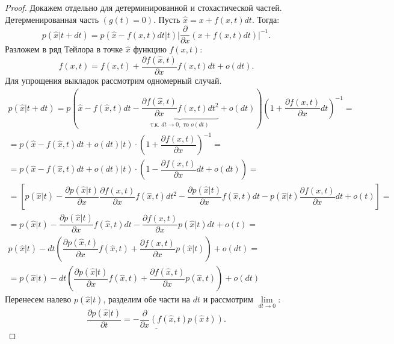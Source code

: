 \begin{proof}
    Докажем отдельно для детерминированной и стохастической частей. Детерменированная часть $(g(t) = 0)$. Пусть $\hat{x} = x + f(x,t)dt$. Тогда:
    \[
        p(\hat{x} | t + dt) = p(\hat{x} - f(x,t)dt | t) \bigg|\dfrac{\partial }{\partial x} (x + f(x, t)dt)\bigg|^{-1}.
    \]
    Разложем в ряд Тейлора в точке $\hat{x}$ функцию $f(x,t)$:
    \[
        f(x, t) = f(\hat{x}, t) + \dfrac{\partial f(\hat{x}, t)}{\partial x} f(x,t)dt + o(dt).
    \]
    Для упрощения выкладок рассмотрим одномерный случай. 
    \[
        \begin{array}{c}
            p(\hat{x} | t + dt) = p\left(\hat{x} - f(\hat{x}, t) dt - \underbrace{\dfrac{\partial f(\hat{x}, t)}{\partial x} f(x, t) dt^2}_{\text{т.к. } dt \to 0, \text{ то } o(dt)} + o(dt)\right)\left(1 + \dfrac{\partial f(x, t)}{\partial x} dt\right)^{-1} = \\[0.5cm]
            = p(\hat{x} - f(\hat{x}, t)dt + o(dt)| t) \cdot \left(1 + \dfrac{\partial f(x, t)}{\partial x}\right)^{-1} = \\[0.5cm]
            = p(\hat{x} - f(\hat{x}, t) dt + o(dt) | t) \cdot \left(1 - \dfrac{\partial f(x, t)}{\partial x} dt + o(dt)\right) = \\ [0.5cm]
            = \left[p(\hat{x} | t) - \dfrac{\partial p(\hat{x} | t)}{\partial x} \dfrac{\partial f(x,t)}{\partial x} f(\hat{x}, t)dt^2 - \dfrac{\partial p(\hat{x} | t)}{\partial x} f(\hat{x}, t)dt - p(\hat{x} | t) \dfrac{\partial f(x,t)}{\partial x} dt + o(t)\right] = \\[0.5cm]
            = p(\hat{x} | t) - \dfrac{\partial p(\hat{x} | t)}{\partial x} f(\hat{x}, t) dt - \dfrac{\partial f(x,t)}{\partial x} p(\hat{x} | t) dt + o(t) = \\
            p(\hat{x}  | t) - dt \left(\dfrac{\partial p(\hat{x}, t)}{\partial x} f(\hat{x} , t) + \dfrac{\partial f(x,t)}{\partial x} p(\hat{x} | t)\right) + o(dt) = \\
            = p(\hat{x} | t) - dt\left(\dfrac{\partial p(\hat{x} | t)}{\partial x} f(\hat{x}, t) + \dfrac{\partial f(\hat{x}, t)}{\partial x} p(\hat{x}, t)\right) + o(dt)
        \end{array}
    \]
    Перенесем налево $p(\hat{x} | t)$, разделим обе части на $dt$ и рассмотрим $\lim\limits_{dt\to 0}$:
    \[
        \underline{\dfrac{\partial p(\hat{x} | t)}{\partial t} = -\dfrac{\partial }{\partial x} \left(f(\hat{x}, t) p(\hat{x} \ t)\right). }
    \]


\end{proof}
